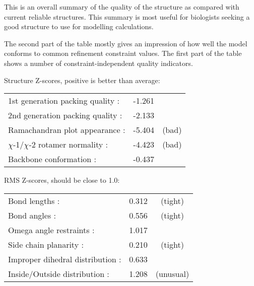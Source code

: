 \begin{note}


\parbox{1\textwidth}{
}%


\parbox{1\textwidth}{
}%

\end{note}

\begin{note}
This is an overall summary of the quality of the structure as
compared with current reliable structures. This summary is most
useful for biologists seeking a good structure to use for modelling
calculations.

The second part of the table mostly gives an impression of how well
the model conforms to common refinement constraint values. The
first part of the table shows a number of constraint-independent
quality indicators.

\parbox{1\textwidth}{

 Structure Z-scores, positive is better than average:

\begin{tabular}{lrc}
  1st generation packing quality :&  -1.261\\
  2nd generation packing quality :&  -2.133\\
  Ramachandran plot appearance   :&  -5.404& (bad)\\
  $\chi$-1/$\chi$-2 rotamer normality  :&  -4.423& (bad)\\
  Backbone conformation          :&  -0.437\\
\end{tabular}

 RMS Z-scores, should be close to 1.0:

\begin{tabular}{lrc}
  Bond lengths                   :&   0.312& (tight)\\
  Bond angles                    :&   0.556& (tight)\\
  Omega angle restraints         :&   1.017\\
  Side chain planarity           :&   0.210& (tight)\\
  Improper dihedral distribution :&   0.633\\
  Inside/Outside distribution    :&   1.208& (unusual)\\
\end{tabular}
}%

\end{note}


